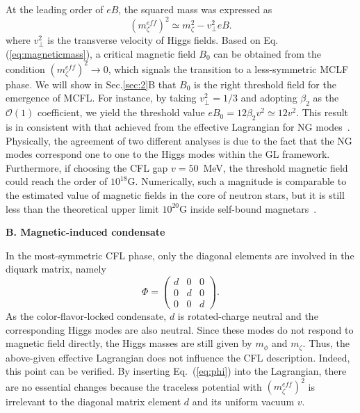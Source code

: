 \documentclass[12pt]{article}
\begin{document}
At the leading order of $eB$, the squared mass was expressed as \cite{zhang2015magnetic}
\begin{equation}
\label{eq:magneticmass}
(m_\zeta^{eff})^2 \simeq m_\zeta^2 - v_\perp^2eB.
\end{equation}
where $v_\perp^2$ is the transverse velocity of Higgs fields.
Based on Eq.(\ref{eq:magneticmass}), a critical magnetic field $B_0$ can be obtained from the condition $(m_\zeta^{eff})^2 \rightarrow 0$, which signals the transition to a less-symmetric
MCLF phase. We will show in Sec.\ref{sec:2}B that $B_0$ is the right threshold field for the emergence of MCFL.
For instance, by taking $v_\perp^2=1/3$ and adopting $\beta_2$ as
the $\mathscr{O}(1)$ coefficient, we yield the threshold value $eB_0 = 12\beta_2 v^2 \simeq 12v^2$.
This result is in consistent with that achieved from the effective Lagrangian for NG
modes~\cite{ferrer2007magnetic}. Physically, the agreement of two different analyses is due to
the fact that the NG modes correspond one to one to the Higgs modes within the GL framework.
Furthermore, if choosing the CFL gap $v = 50$~MeV, the threshold magnetic field could reach the
order of $10^{18}\text{G}$. Numerically, such a magnitude is comparable to the estimated value of
magnetic fields in the core of neutron stars, but it is still less than the theoretical upper
limit $10^{20}\text{G}$ inside self-bound magnetars~\cite{dong2001,lai1991cold}.

\vspace{0.2cm}
\textbf{B. Magnetic-induced condensate}
\vspace{0.2cm}

In the most-symmetric CFL phase, only the diagonal elements are involved in the diquark matrix, namely
\begin{equation}
  \label{eq:phi}
  \Phi =
  \begin{pmatrix}
    d & 0 & 0 \\
    0 & d & 0 \\
    0 & 0 & d
    \end{pmatrix}.\end{equation}
As the color-flavor-locked condensate, $d$ is rotated-charge neutral and the corresponding Higgs
modes are also neutral. Since these modes do not respond to magnetic field directly, the Higgs
masses are still given by $m_\phi$ and $m_\zeta$. Thus, the above-given effective Lagrangian does
not influence the CFL description. Indeed, this point can be verified. By inserting Eq.~(\ref{eq:phi})
into the Lagrangian, there are no essential changes because the traceless potential with
$(m_\zeta^{eff})^2$ is irrelevant to the diagonal matrix element $d$ and its uniform vacuum $v$.
\end{document}
